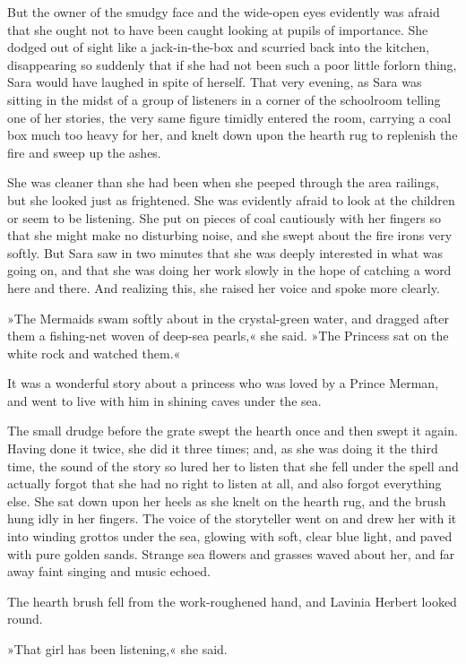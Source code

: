 But the owner of the smudgy face and the wide-open eyes evidently was afraid that she ought not to have been caught looking at pupils of importance. She dodged out of sight like a jack-in-the-box and scurried back into the kitchen, disappearing so suddenly that if she had not been such a poor little forlorn thing, Sara would have laughed in spite of herself. That very evening, as Sara was sitting in the midst of a group of listeners in a corner of the schoolroom telling one of her stories, the very same figure timidly entered the room, carrying a coal box much too heavy for her, and knelt down upon the hearth rug to replenish the fire and sweep up the ashes.

She was cleaner than she had been when she peeped through the area railings, but she looked just as frightened. She was evidently afraid to look at the children or seem to be listening. She put on pieces of coal cautiously with her fingers so that she might make no disturbing noise, and she swept about the fire irons very softly. But Sara saw in two minutes that she was deeply interested in what was going on, and that she was doing her work slowly in the hope of catching a word here and there. And realizing this, she raised her voice and spoke more clearly.

»The Mermaids swam softly about in the crystal-green water, and dragged after them a fishing-net woven of deep-sea pearls,« she said. »The Princess sat on the white rock and watched them.«

It was a wonderful story about a princess who was loved by a Prince Merman, and went to live with him in shining caves under the sea.

The small drudge before the grate swept the hearth once and then swept it again. Having done it twice, she did it three times; and, as she was doing it the third time, the sound of the story so lured her to listen that she fell under the spell and actually forgot that she had no right to listen at all, and also forgot everything else. She sat down upon her heels as she knelt on the hearth rug, and the brush hung idly in her fingers. The voice of the storyteller went on and drew her with it into winding grottos under the sea, glowing with soft, clear blue light, and paved with pure golden sands. Strange sea flowers and grasses waved about her, and far away faint singing and music echoed.

The hearth brush fell from the work-roughened hand, and Lavinia Herbert looked round.

»That girl has been listening,« she said.

